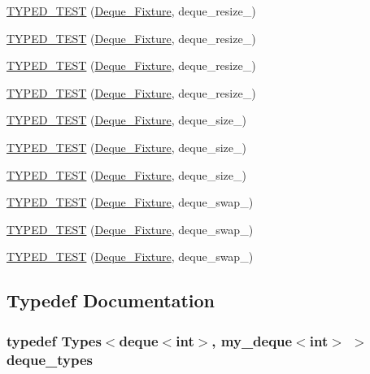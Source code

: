 \begin{DoxyCompactItemize}
\hyperlink{TestDeque_8c_09_09_a2f9e46ac13f3e2f512b58b907107a4f7}{T\-Y\-P\-E\-D\-\_\-\-T\-E\-S\-T} (\hyperlink{structDeque__Fixture}{Deque\-\_\-\-Fixture}, deque\-\_\-resize\-\_)
\item 
\hyperlink{TestDeque_8c_09_09_ac5d8b189d71752bfcce39c2d5a5c483a}{T\-Y\-P\-E\-D\-\_\-\-T\-E\-S\-T} (\hyperlink{structDeque__Fixture}{Deque\-\_\-\-Fixture}, deque\-\_\-resize\-\_)
\item 
\hyperlink{TestDeque_8c_09_09_a7fe9541c81ee3505e71e49e5bf165f53}{T\-Y\-P\-E\-D\-\_\-\-T\-E\-S\-T} (\hyperlink{structDeque__Fixture}{Deque\-\_\-\-Fixture}, deque\-\_\-resize\-\_)
\item 
\hyperlink{TestDeque_8c_09_09_a8bad25955416d61f42063ad95ce64c84}{T\-Y\-P\-E\-D\-\_\-\-T\-E\-S\-T} (\hyperlink{structDeque__Fixture}{Deque\-\_\-\-Fixture}, deque\-\_\-resize\-\_)
\item 
\hyperlink{TestDeque_8c_09_09_ab7cecc8a1ddc3e1f61595f00d1a41b47}{T\-Y\-P\-E\-D\-\_\-\-T\-E\-S\-T} (\hyperlink{structDeque__Fixture}{Deque\-\_\-\-Fixture}, deque\-\_\-size\-\_)
\item 
\hyperlink{TestDeque_8c_09_09_a1765864b0be647a7acdea1108400bb0d}{T\-Y\-P\-E\-D\-\_\-\-T\-E\-S\-T} (\hyperlink{structDeque__Fixture}{Deque\-\_\-\-Fixture}, deque\-\_\-size\-\_)
\item 
\hyperlink{TestDeque_8c_09_09_a250b377fa03479982e17976df76803bd}{T\-Y\-P\-E\-D\-\_\-\-T\-E\-S\-T} (\hyperlink{structDeque__Fixture}{Deque\-\_\-\-Fixture}, deque\-\_\-size\-\_)
\item 
\hyperlink{TestDeque_8c_09_09_af0b3334a21157757fb001e42e60fee57}{T\-Y\-P\-E\-D\-\_\-\-T\-E\-S\-T} (\hyperlink{structDeque__Fixture}{Deque\-\_\-\-Fixture}, deque\-\_\-swap\-\_)
\item 
\hyperlink{TestDeque_8c_09_09_ad12dd21e173f70f39bfdb540b59d8e1d}{T\-Y\-P\-E\-D\-\_\-\-T\-E\-S\-T} (\hyperlink{structDeque__Fixture}{Deque\-\_\-\-Fixture}, deque\-\_\-swap\-\_)
\item 
\hyperlink{TestDeque_8c_09_09_a87e3649fb1ebba3d08212cd5f34e1654}{T\-Y\-P\-E\-D\-\_\-\-T\-E\-S\-T} (\hyperlink{structDeque__Fixture}{Deque\-\_\-\-Fixture}, deque\-\_\-swap\-\_)
\end{DoxyCompactItemize}


\subsection{Typedef Documentation}
\hypertarget{TestDeque_8c_09_09_a44a3d805a5bc19d6bc402da26200d63d}{
\subsubsection[{deque\-\_\-types}]{\setlength{\rightskip}{0pt plus 5cm}typedef Types$<$deque$<$int$>$, {\bf my\-\_\-deque}$<$int$>$ $>$ {\bf deque\-\_\-types}}}\label{TestDeque_8c_09_09_a44a3d805a5bc19d6bc402da26200d63d}


